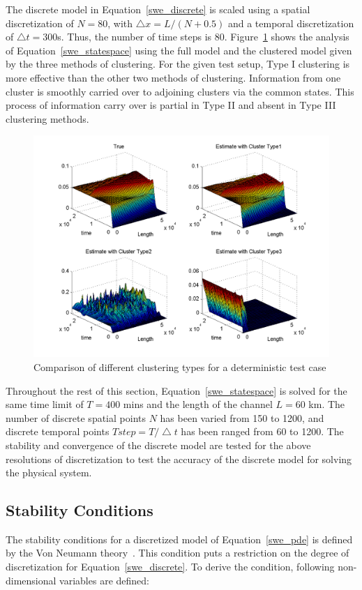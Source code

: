 The discrete model in Equation~\ref{swe_discrete} is scaled using a spatial discretization of $N = 80$, with $\bigtriangleup x = L/(N+0.5)$ and a temporal discretization of $\bigtriangleup t = 300$s. Thus, the number of time steps is 80. Figure~\ref{Clustering_Types} shows the analysis of Equation~\ref{swe_statespace} using the full model and the clustered model given by the three methods of clustering. For the given test setup, Type I clustering is more effective than the other two methods of clustering. Information from one cluster is smoothly carried over to adjoining clusters via the common states. This process of information carry over is partial in Type II and absent in Type III clustering methods. 

\begin{figure}[H]
\centering
\includegraphics[scale=0.8]{figures_2/fig_comp_162_clust}
\caption{Comparison of different clustering types for a deterministic test case}
\label{Clustering_Types}
\end{figure} 

Throughout the rest of this section, Equation~\ref{swe_statespace} is solved for the same time limit of $T =  400$ mins and the length of the channel $L = 60$ km. The number of discrete spatial points $N$ has been varied from 150 to 1200, and discrete temporal points $Tstep =  T/\bigtriangleup t$ has been ranged from 60 to 1200. The stability and convergence of the discrete model are tested for the above resolutions of discretization to test the accuracy of the discrete model for solving the physical system.

\subsection{Stability Conditions}
\label{stability}
The stability conditions for a discretized model of Equation~\ref{swe_pde} is defined by the Von Neumann theory~\cite{charney1950numerical}. This condition puts a restriction on the degree of discretization for Equation~\ref{swe_discrete}. To derive the condition, following non-dimensional variables are defined:

